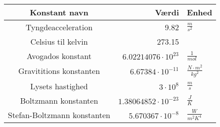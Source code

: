 \begin{tabular}{|c|rl|}
	\hline
	Konstant navn&Værdi&Enhed\\
	\hline
	Tyngdeacceleration&9.82&$\frac{m}{s^2}$\\
	Celsius til kelvin&273.15&\\
	Avogados konstant&$6.02214076\cdot 10^{23}$&$\frac{1}{mol}$\\
	Gravititions konstanten&$6.67384\cdot 10^{-11}$&$\frac{N\cdot m^2}{kg^2}$\\
	Lysets hastighed&$3\cdot 10^8$&$\frac{m}{s}$\\
	Boltzmann konstanten&$1.38064852\cdot 10^{-23}$&$\frac{J}{K}$\\
	Stefan-Boltzmann konstanten&$5.670367\cdot 10^{-8}$&$\frac{W}{m^2K^4}$\\
	\hline
\end{tabular}